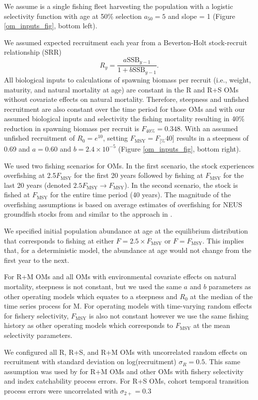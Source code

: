 \documentclass[
  12pt,
]{article}
\newcommand{\Fmsy}{\ensuremath{F_{\text{MSY}}}\xspace}
\newcommand{\Fspr}[1]{\ensuremath{F_{\text{{#1}\%}}}\xspace}
\begin{document}
We assume is a single fishing fleet harvesting the population with a logistic selectivity function with age at 50\% selection \(a_{50} = 5\) and slope = 1 (Figure \ref{om_inputs_fig}, bottom left).

We assumed expected recruitment each year from a Beverton-Holt stock-recruit relationship (SRR)
\[
R_{y} = \frac{a \text{SSB}_{y-1}}{1 + b \text{SSB}_{y-1}}.
\]
All biological inputs to calculations of spawning biomass per recruit (i.e., weight, maturity, and natural mortality at age) are constant in the R and R+S OMs without covariate effects on natural mortality. Therefore, steepness and unfished recruitment are also constant over the time period for those OMs \citep{millerbrooks21} and with our assumed biological inputs and selectivity the fishing mortality resulting in 40\% reduction in spawning biomass per recruit is \(F_{40\%} = 0.348\). With an assumed unfished recruitment of \(R_0 = e^{10}\), setting \(\Fmsy = \Fspr[40]\) results in a steepness of 0.69 and \(a=0.60\) and \(b = 2.4 \times 10^{-5}\) (Figure \ref{om_inputs_fig}, bottom right).

We used two fishing scenarios for OMs. In the first scenario, the stock experiences overfishing at 2.5\Fmsy for the first 20 years followed by fishing at \Fmsy for the last 20 years (denoted \(2.5\Fmsy \rightarrow \Fmsy\)). In the second scenario, the stock is fished at \Fmsy for the entire time period (40 years). The magnitude of the overfishing assumptions is based on average estimates of overfishing for NEUS groundfish stocks from \citet{wiedenmannetal19} and similar to the approach in \citet{legaultetal23}.

We specified initial population abundance at age at the equilibrium distribution that corresponds to fishing at either \(F = 2.5\times \Fmsy\) or \(F = \Fmsy\). This implies that, for a deterministic model, the abundance at age would not change from the first year to the next.

For R+M OMs and all OMs with environmental covariate effects on natural mortality, steepness is not constant, but we used the same \(a\) and \(b\) parameters as other operating models which equates to a steepness and \(R_0\) at the median of the time series process for M. For operating models with time-varying random effects for fishery selectivity, \Fmsy is also not constant however we use the same fishing history as other operating models which corresponds to \Fmsy at the mean selectivity parameters.

We configured all R, R+S, and R+M OMs with uncorrelated random effects on recruitment with standard deviation on log(recruitment) \(\sigma_R = 0.5\). This same assumption was used by \citet{milleretal_inreview1} for R+M OMs and other OMs with fishery selectivity and index catchability process errors. For R+S OMs, cohort temporal transition process errors were uncorrelated with \(\sigma_{2+} = 0.3\)
\end{document}
